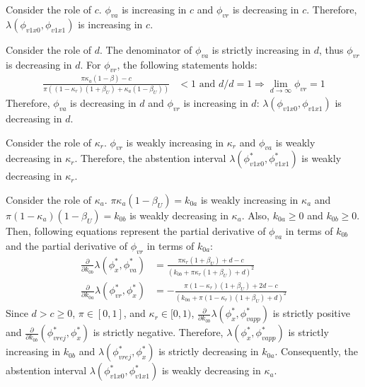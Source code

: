 \par Consider the role of $c$. $\phi_{va}$ is increasing in $c$ and $\phi_{vr}$ is decreasing in $c$. Therefore, $\lambda(\phi_{v1x0},\phi_{v1x1})$ is increasing in $c$. 

\par Consider the role of $d$. The denominator of $\phi_{va}$ is strictly increasing in $d$, thus $\phi_{vr}$ is decreasing in $d$. For $\phi_{vr}$, the following statements holds:
\begin{align*}
\frac{\pi \kappa_{a} (1-\beta) - c}{\pi ( (1-\kappa_{r}) (1+\beta_U) + \kappa_{a} (1-\beta_U))} &< 1 \text{ and } d/d = 1 \Rightarrow \lim_{d \to \infty} \phi_{vr} = 1 
\end{align*}
\noindent Therefore, $\phi_{va}$ is decreasing in $d$ and $\phi_{vr}$ is increasing in $d$: $\lambda(\phi_{v1x0},\phi_{v1x1})$ is decreasing in $d$.

\par Consider the role of $\kappa_{r}$. $\phi_{vr}$ is weakly increasing in $\kappa_{r}$ and $\phi_{va}$ is weakly decreasing in $\kappa_{r}$. Therefore, the abstention interval $\lambda (\phi^*_{v1x0}, \phi^*_{v1x1})$ is weakly decreasing in $\kappa_{r}$. 

\par Consider the role of $\kappa_{a}$. $\pi \kappa_{a} (1-\beta_U)= k_{0a}$ is weakly increasing in  $\kappa_{a}$  and $\pi (1-\kappa_{a}) (1-\beta_U) = k_{0b}$ is weakly decreasing in $\kappa_{a}$. Also, $k_{0a} \geq 0$ and $k_{0b} \geq 0$. Then, following equations represent the partial derivative of $\phi_{va}$ in terms of $k_{0b}$ and the partial derivative of $\phi_{vr}$ in terms of $k_{0a}$:
\begin{align*}
\frac{\partial}{\partial k_{0b}} \lambda (\phi^*_x, \phi^*_{va}) &= \frac{  \pi \kappa_{r}(1+\beta_U) + d - c}{(k_{0b} + \pi \kappa_{r}(1+\beta_U) + d)^2} \\
\frac{\partial}{\partial k_{0a}} \lambda (\phi^*_{vr}, \phi^*_x) &=  - \frac{\pi (1-\kappa_{r}) (1 + \beta_U) + 2 d - c}{(k_{0a} + \pi (1-\kappa_{r}) (1+\beta_U) + d)^2} 
\end{align*}
\noindent Since $d > c \geq 0$, $\pi \in [0,1]$, and $\kappa_{r} \in [0,1)$, $\frac{\partial}{\partial k_{0b}} \lambda (\phi^*_x, \phi^*_{vapp}) $ is strictly positive and $ \frac{\partial}{\partial k_{0b}} (\phi^*_{vrej}, \phi^*_x)$ is strictly negative. Therefore, $\lambda (\phi^*_x, \phi^*_{vapp})$ is strictly increasing in $k_{0b}$ and $\lambda (\phi^*_{vrej}, \phi^*_x)$ is strictly decreasing in $k_{0a}$. Consequently, the abstention interval $\lambda (\phi^*_{v1x0}, \phi^*_{v1x1})$ is weakly decreasing in $\kappa_{a}$. 


